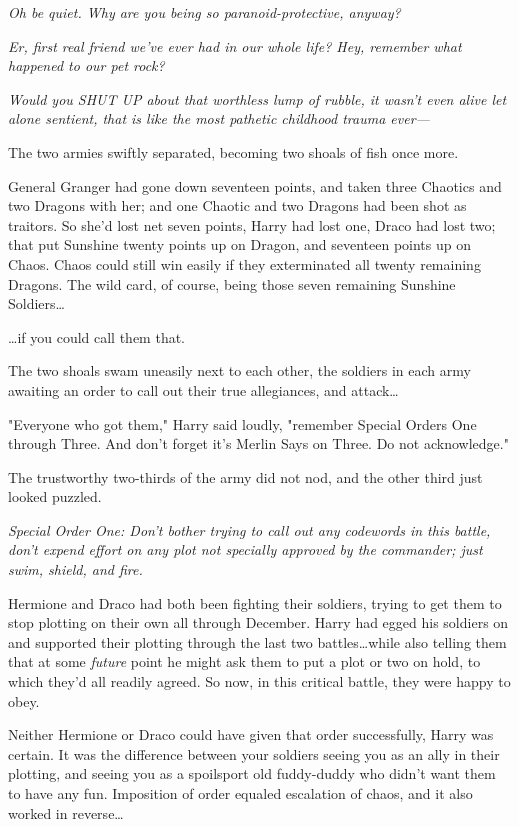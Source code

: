 \emph{Oh be quiet. Why are you being so paranoid-protective, anyway?}

\emph{Er, first real friend we've ever had in our whole life? Hey, remember
what happened to our pet rock?}

\emph{Would you SHUT UP about that worthless lump of rubble, it wasn't even
alive let alone sentient, that is like the most pathetic childhood trauma
ever---}

The two armies swiftly separated, becoming two shoals of fish once more.

General Granger had gone down seventeen points, and taken three Chaotics and
two Dragons with her; and one Chaotic and two Dragons had been shot as
traitors. So she'd lost net seven points, Harry had lost one, Draco had lost
two; that put Sunshine twenty points up on Dragon, and seventeen points up on
Chaos. Chaos could still win easily if they exterminated all twenty remaining
Dragons. The wild card, of course, being those seven remaining Sunshine
Soldiers…

…if you could call them that.

The two shoals swam uneasily next to each other, the soldiers in each army
awaiting an order to call out their true allegiances, and attack…

"Everyone who got them," Harry said loudly, "remember Special Orders One
through Three. And don't forget it's Merlin Says on Three. Do not acknowledge."

The trustworthy two-thirds of the army did not nod, and the other third just
looked puzzled.

\emph{Special Order One: Don't bother trying to call out any codewords in this
battle, don't expend effort on any plot not specially approved by the
commander; just swim, shield, and fire.}

Hermione and Draco had both been fighting their soldiers, trying to get them to
stop plotting on their own all through December. Harry had egged his soldiers
on and supported their plotting through the last two battles…while also
telling them that at some \emph{future} point he might ask them to put a plot
or two on hold, to which they'd all readily agreed. So now, in this critical
battle, they were happy to obey.

Neither Hermione or Draco could have given that order successfully, Harry was
certain. It was the difference between your soldiers seeing you as an ally in
their plotting, and seeing you as a spoilsport old fuddy-duddy who didn't want
them to have any fun. Imposition of order equaled escalation of chaos, and it
also worked in reverse…

